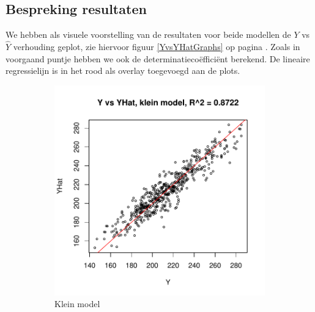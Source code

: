 \documentclass[a4paper,12pt]{report}
\begin{document}
\subsection{Bespreking resultaten}
\label{resultaten}
We hebben als visuele voorstelling van de resultaten voor beide modellen de $Y$ vs $\hat{Y}$ verhouding geplot, zie hiervoor figuur \ref{YvsYHatGraphs} op pagina \pageref{YvsYHatGraphs}. Zoals in voorgaand puntje hebben we ook de determinatieco\"effici\"ent berekend. De lineaire regressielijn is in het rood als overlay toegevoegd aan de plots.
\begin{figure}
        \centering
        \begin{subfigure}[b]{0.45\textwidth}
                \includegraphics[width=\textwidth]{includes/Y-YHat-small}
                \caption{Klein model}
        \end{subfigure}
        \begin{subfigure}[b]{0.45\textwidth}

\end{subfigure}
\end{figure}
\end{document}
